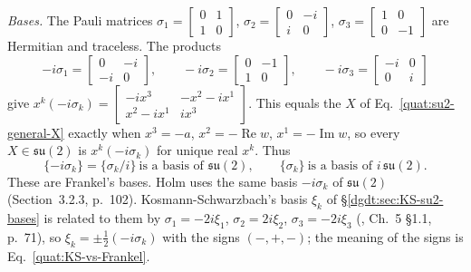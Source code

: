 \emph{Bases.} The Pauli matrices
$\sigma_1=\begin{bmatrix}0&1\\1&0\end{bmatrix}$,
$\sigma_2=\begin{bmatrix}0&-i\\i&0\end{bmatrix}$,
$\sigma_3=\begin{bmatrix}1&0\\0&-1\end{bmatrix}$ are Hermitian and
traceless. The products
\begin{equation}\label{quat:minus-i-sigma}
 -i\sigma_1=\begin{bmatrix}0&-i\\-i&0\end{bmatrix},\qquad
 -i\sigma_2=\begin{bmatrix}0&-1\\1&0\end{bmatrix},\qquad
 -i\sigma_3=\begin{bmatrix}-i&0\\0&i\end{bmatrix}
\end{equation}
give $x^k(-i\sigma_k)=\begin{bmatrix}-ix^3&-x^2-ix^1\\x^2-ix^1&ix^3
\end{bmatrix}$. This equals the $X$ of Eq.~\eqref{quat:su2-general-X} exactly
when $x^3=-a$, $x^2=-\operatorname{Re}w$, $x^1=-\operatorname{Im}w$, so
every $X\in\mathfrak{su}(2)$ is $x^k(-i\sigma_k)$ for unique real $x^k$.
Thus
\begin{equation}\label{quat:su2-bases}
 \{-i\sigma_k\}=\{\sigma_k/i\}\ \text{is a basis of }\mathfrak{su}(2),
 \qquad \{\sigma_k\}\ \text{is a basis of } i\,\mathfrak{su}(2).
\end{equation}
These are Frankel's bases. Holm uses the same basis $-i\sigma_k$ of
$\mathfrak{su}(2)$ (Section~3.2.3, p.~102). Kosmann-Schwarzbach's basis
$\xi_k$ of \S\ref{dgdt:sec:KS-su2-bases} is related to them by
$\sigma_1=-2i\xi_1$, $\sigma_2=2i\xi_2$, $\sigma_3=-2i\xi_3$
(\cite{dgdt:YKosmann-Schwarzbach2010}, Ch.~5 \S1.1, p.~71), so
$\xi_k=\pm\frac12(-i\sigma_k)$ with the signs $(-,+,-)$; the meaning of the
signs is Eq.~\eqref{quat:KS-vs-Frankel}.

